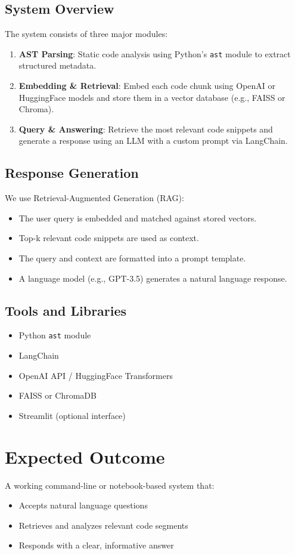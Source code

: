 \documentclass[11pt]{article}
\begin{document}
\subsection*{System Overview}
The system consists of three major modules:
\begin{enumerate}
    \item \textbf{AST Parsing}: Static code analysis using Python’s \texttt{ast} module to extract structured metadata.
    \item \textbf{Embedding \& Retrieval}: Embed each code chunk using OpenAI or HuggingFace models and store them in a vector database (e.g., FAISS or Chroma).
    \item \textbf{Query \& Answering}: Retrieve the most relevant code snippets and generate a response using an LLM with a custom prompt via LangChain.
\end{enumerate}

\subsection*{Response Generation}
We use Retrieval-Augmented Generation (RAG):
\begin{itemize}[noitemsep]
  \item The user query is embedded and matched against stored vectors.
  \item Top-k relevant code snippets are used as context.
  \item The query and context are formatted into a prompt template.
  \item A language model (e.g., GPT-3.5) generates a natural language response.
\end{itemize}

\subsection*{Tools and Libraries}
\begin{itemize}[noitemsep]
  \item Python \texttt{ast} module
  \item LangChain
  \item OpenAI API / HuggingFace Transformers
  \item FAISS or ChromaDB
  \item Streamlit (optional interface)
\end{itemize}

\section{Expected Outcome}
A working command-line or notebook-based system that:
\begin{itemize}[noitemsep]
  \item Accepts natural language questions
  \item Retrieves and analyzes relevant code segments
  \item Responds with a clear, informative answer
\end{itemize}
\end{document}
